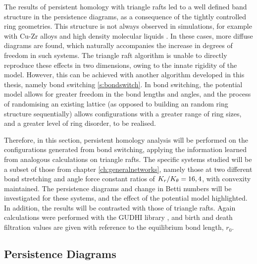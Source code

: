 The results of persistent homology with triangle rafts led to a well defined band structure in the persistence diagrams, as a consequence of the tightly controlled ring geometries.
This structure is not always observed in simulations, for example with Cu\--Zr alloys and high density molecular liquids \cite{Hiraoka2016,Onodera2019}.
In these cases, more diffuse diagrams are found, which naturally accompanies the increase in degrees of freedom in such systems.
The triangle raft algorithm is unable to directly reproduce these effects in two dimensions, owing to the innate rigidity of the model.
However, this can be achieved with another algorithm developed in this thesis, namely bond switching \ref{s:bondswitch}.
In bond switching, the potential model allows for greater freedom in the bond lengths and angles, and the process of randomising an existing lattice (as opposed to building an random ring structure sequentially) allows configurations with a greater range of ring sizes, and a greater level of ring disorder, to be realised.

Therefore, in this section, persistent homology analysis will be performed on the configurations generated from bond switching, applying the information learned from analogous calculations on triangle rafts.
The specific systems studied will be a subset of those from chapter \ref{ch:generalnetworks}, namely those at two different bond stretching and angle force constant ratios of $K_r/K_\theta=16,4$, with convexity maintained.
The persistence diagrams and change in Betti numbers will be investigated for these systems, and the effect of the potential model highlighted.
In addition, the results will be contrasted with those of triangle rafts.
Again calculations were performed with the GUDHI library \cite{gudhi}, and birth and death filtration values are given with reference to the equilibrium bond length, $r_0$.

\subsection{Persistence Diagrams}

